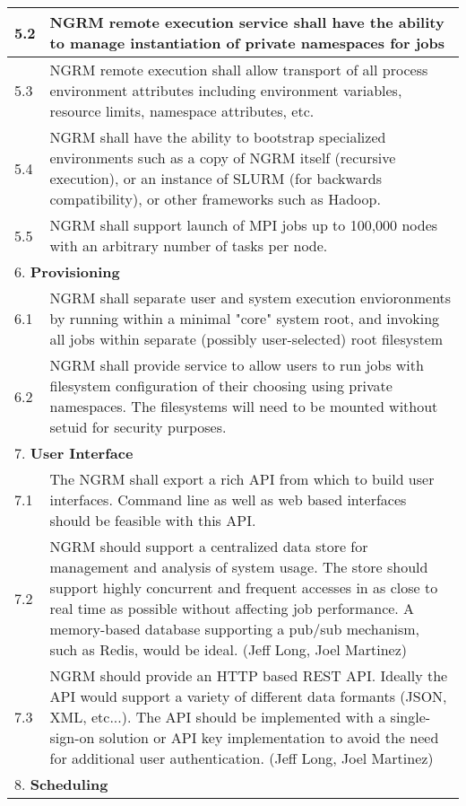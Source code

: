 \begin{longtable}{|p{1cm}|p{15cm}|}
  \hline
  5.2 & NGRM remote execution service shall have the ability to manage
	instantiation of private namespaces for jobs\\
  \hline
  5.3 & NGRM remote execution shall allow transport of all process environment
	attributes including environment variables, resource limits,
	namespace attributes, etc.\\
  \hline
  5.4 & NGRM shall have the ability to bootstrap specialized environments
	such as a copy of NGRM itself (recursive execution), or an instance
	of SLURM (for backwards compatibility), or other frameworks such as
	Hadoop.\\
  \hline
  5.5 & NGRM shall support launch of MPI jobs up to 100,000 nodes with an
	arbitrary number of tasks per node.\\
  \hline
  \multicolumn{2}{|l|}{6. \textbf{Provisioning}} \\
  \hline
  6.1 & NGRM shall separate user and system execution envioronments by
	running within a minimal "core" system root, and invoking all jobs
	within separate (possibly user-selected) root filesystem\\
  \hline
  6.2 & NGRM shall provide service to allow users to run jobs with
	filesystem configuration of their choosing using private namespaces.
	The filesystems will need to be mounted without setuid for security
	purposes.\\
  \hline
  \multicolumn{2}{|l|}{7. \textbf{User Interface}} \\
  \hline
  7.1 & The NGRM shall export a rich API from which to build user interfaces.
	Command line as well as web based interfaces should be feasible with
	this API.\\
  \hline
  7.2 & NGRM should support a centralized data store for management and
	analysis of system usage. The store should support highly concurrent
	and frequent accesses in as close to real time as possible without
	affecting job performance. A memory-based database supporting a
	pub/sub mechanism, such as Redis, would be ideal. (Jeff Long,
	Joel Martinez)\\
  \hline
  7.3 & NGRM should provide an HTTP based REST API. Ideally the API would
	support a variety of different data formants (JSON, XML, etc...).
	The API should be implemented with a single-sign-on solution or
	API key implementation to avoid the need for additional user
	authentication. (Jeff Long, Joel Martinez)\\
  \hline
  \multicolumn{2}{|l|}{8. \textbf{Scheduling}} \\

\end{longtable}
